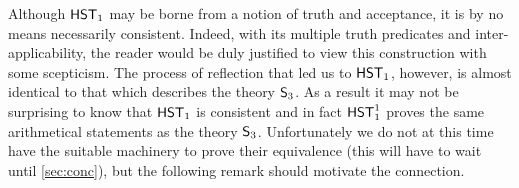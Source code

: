 \documentclass[UKenglish,cleveref,DIV=12]{scrartcl}
\theoremstyle{definition}
\theoremstyle{definition}
\begin{document}
Although $\mathsf{HST}_1$ may be borne from a notion of
truth and acceptance, it is by no means necessarily consistent.
Indeed, with its multiple
truth predicates and inter-applicability, the reader would be duly justified to
view this construction with some scepticism. The process of reflection that led
us to $\mathsf{HST}_1$, however, is almost identical to that which describes the theory
$\mathsf{S}_3$. As a result it may not be surprising to know that $\mathsf{HST}_1$ is
consistent and in fact $\mathsf{HST}_1^1$ proves the same arithmetical statements as the
theory $\mathsf{S}_3$. Unfortunately we do not at this time have the suitable
machinery to prove their equivalence ({this will have to wait until
\cref{sec:conc}}), but the
following remark should motivate the connection.
\end{document}
